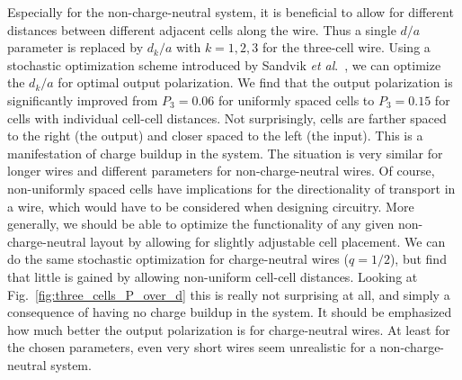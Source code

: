 Especially for the non-charge-neutral system, it is beneficial to allow for
different distances between different adjacent cells along the wire. Thus a
single $d/a$ parameter is replaced by $d_k/a$ with $k = 1,2,3$ for the
three-cell wire. Using a stochastic optimization scheme introduced by Sandvik
\emph{et al}.\ \cite{Sandvik2007}, we can optimize the $d_k/a$ for optimal
output polarization. We find that the output polarization is significantly
improved from $P_3 = 0.06$ for uniformly spaced cells to $P_3 = 0.15$ for cells
with individual cell-cell distances. Not surprisingly, cells are farther spaced
to the right (the output) and closer spaced to the left (the input). This is a
manifestation of charge buildup in the system. The situation is very similar for
longer wires and different parameters for non-charge-neutral wires. Of course,
non-uniformly spaced cells have implications for the directionality of
transport in a wire, which would have to be considered when designing 
circuitry. More generally, we should be able to optimize the functionality of
any given non-charge-neutral  layout by allowing for slightly
adjustable cell placement. We can do the same stochastic optimization for
charge-neutral wires ($q=1/2$), but find that little is gained by allowing
non-uniform cell-cell distances. Looking at Fig.~\ref{fig:three_cells_P_over_d}
this is really not surprising at all, and simply a consequence of having no
charge buildup in the system. It should be emphasized how much better the output
polarization is for charge-neutral wires. At least for the chosen parameters,
even very short wires seem unrealistic for a non-charge-neutral system.

